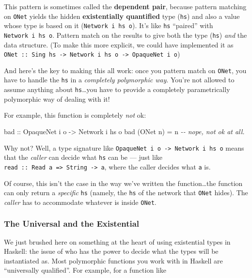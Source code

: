 \documentclass[]{article}
\newenvironment{Shaded}{}{}
\newcommand{\CommentTok}[1]{\textcolor[rgb]{0.38,0.63,0.69}{\textit{#1}}}
\newcommand{\DataTypeTok}[1]{\textcolor[rgb]{0.56,0.13,0.00}{#1}}
\newcommand{\NormalTok}[1]{#1}
\newcommand{\OtherTok}[1]{\textcolor[rgb]{0.00,0.44,0.13}{#1}}
\begin{document}
This pattern is sometimes called the \textbf{dependent pair}, because pattern
matching on \texttt{ONet} yields the hidden \textbf{existentially quantified}
type (\texttt{hs}) and also a value whose type is based on it
(\texttt{Network\ i\ hs\ o}). It's like \texttt{hs} ``paired'' with
\texttt{Network\ i\ hs\ o}. Pattern match on the results to give both the type
(\texttt{hs}) \emph{and} the data structure. (To make this more explicit, we
could have implemented it as
\texttt{ONet\ ::\ Sing\ hs\ -\textgreater{}\ Network\ i\ hs\ o\ -\textgreater{}\ OpaqueNet\ i\ o})

And here's the key to making this all work: once you pattern match on
\texttt{ONet}, you have to handle the \texttt{hs} in a \emph{completely
polymorphic way}. You're not allowed to assume anything about
\texttt{hs}\ldots you have to provide a completely parametrically polymorphic
way of dealing with it!

For example, this function is completely \emph{not} ok:

\begin{Shaded}
\begin{Highlighting}[]
\OtherTok{bad ::} \DataTypeTok{OpaqueNet}\NormalTok{ i o }\OtherTok{{-}\textgreater{}} \DataTypeTok{Network}\NormalTok{ i hs o}
\NormalTok{bad (}\DataTypeTok{ONet}\NormalTok{ n) }\OtherTok{=}\NormalTok{ n            }\CommentTok{{-}{-} nope, not ok at all.}
\end{Highlighting}
\end{Shaded}

Why not? Well, a type signature like
\texttt{OpaqueNet\ i\ o\ -\textgreater{}\ Network\ i\ hs\ o} means that the
\emph{caller} can decide what \texttt{hs} can be --- just like
\texttt{read\ ::\ Read\ a\ =\textgreater{}\ String\ -\textgreater{}\ a}, where
the caller decides what \texttt{a} is.

Of course, this isn't the case in the way we've written the function\ldots the
function can only return a \emph{specific} \texttt{hs} (namely, the \texttt{hs}
of the network that \texttt{ONet} hides). The \emph{caller} has to accommodate
whatever is inside \texttt{ONet}.

\subsubsection{The Universal and the
Existential}\label{the-universal-and-the-existential}

We just brushed here on something at the heart of using existential types in
Haskell: the issue of who has the power to decide what the types will be
instantiated as. Most polymorphic functions you work with in Haskell are
``universally qualified''. For example, for a function like
\end{document}
